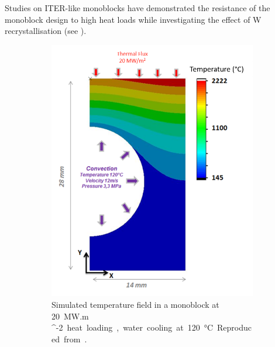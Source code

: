 Studies on ITER-like \glspl{monoblock} have demonstrated the resistance of the \gls{monoblock} design to high heat loads while investigating the effect of \Gls{W} recrystallisation  (see ).

\begin{figure} [h]
    \centering
    \begin{subfigure}[t]{0.45\linewidth}
            \includegraphics[width=\linewidth]{Figures/Chapter1/alan_durif_monoblock.png}
            \caption{Simulated temperature field in a monoblock at \SI{20}{MW.m ^{-2}} heat loading, water cooling at \SI{120}{\celsius}. Reproduced from \cite{durif_modelisation_2019}.}
    \end{subfigure}\hfill%
    \begin{subfigure}[t]{0.45\linewidth}

\end{subfigure}
\end{figure}
